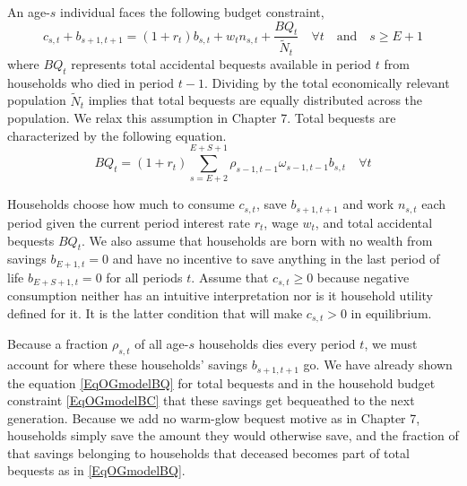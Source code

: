\documentclass[letterpaper,12pt]{article}
\theoremstyle{definition}
\begin{document}
    An age-$s$ individual faces the following budget constraint,
    \begin{equation}\label{EqOGmodelBC}
      c_{s,t} + b_{s+1,t+1} = (1 + r_{t})b_{s,t} + w_t n_{s,t} + \frac{BQ_t}{\tilde{N}_t}  \quad\forall t\quad\text{and}\quad s\geq E+1
    \end{equation}
    where $BQ_t$ represents total accidental bequests available in period $t$ from households who died in period $t-1$. Dividing by the total economically relevant population $\tilde{N}_t$ implies that total bequests are equally distributed across the population. We relax this assumption in Chapter 7. Total bequests are characterized by the following equation.
    \begin{equation}\label{EqOGmodelBQ}
      BQ_t = (1 + r_t)\sum_{s = E+2}^{E+S+1}\rho_{s-1,t-1}\omega_{s-1,t-1}b_{s,t} \quad \forall t
    \end{equation}

    Households choose how much to consume $c_{s,t}$, save $b_{s+1,t+1}$ and work $n_{s,t}$ each period given the current period interest rate $r_t$, wage $w_t$, and total accidental bequests $BQ_t$. We also assume that households are born with no wealth from savings $b_{E+1,t} = 0$ and have no incentive to save anything in the last period of life $b_{E+S+1,t}=0$ for all periods $t$. Assume that $c_{s,t}\geq 0$ because negative consumption neither has an intuitive interpretation nor is it household utility defined for it. It is the latter condition that will make $c_{s,t}>0$ in equilibrium.

    Because a fraction $\rho_{s,t}$ of all age-$s$ households dies every period $t$, we must account for where these households' savings $b_{s+1,t+1}$ go. We have already shown the equation \eqref{EqOGmodelBQ} for total bequests and in the household budget constraint \eqref{EqOGmodelBC} that these savings get bequeathed to the next generation. Because we add no warm-glow bequest motive as in Chapter 7, households simply save the amount they would otherwise save, and the fraction of that savings belonging to households that deceased becomes part of total bequests as in \eqref{EqOGmodelBQ}.
\end{document}
